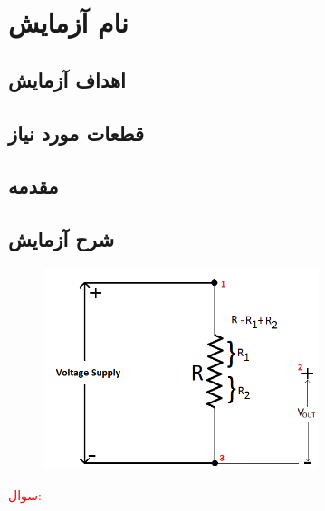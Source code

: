 \section{نام آزمایش}

\subsection{اهداف آزمایش}

\subsection{قطعات مورد نیاز}

\subsection{مقدمه}

\subsection{شرح آزمایش}

\newline
\begin{nas} \end{nas}
\newline

\newline
\begin{figure}[h]
    \centering
    \includegraphics[width=8cm]{pot.png}
    \caption{}
    \label{fig:pot-circ}
\end{figure}
\newline

\newline
\textcolor{red}{\begin{nas}سوال: \end{nas}}
